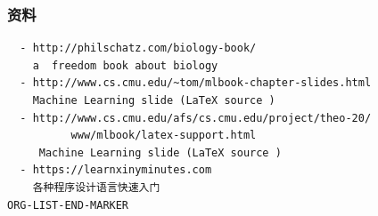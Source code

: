 \documentclass{beamer}
\begin{document}
\begin{frame}[fragile]
\frametitle{资料}
\label{sec-6-3}


\begin{verbatim}
  - http://philschatz.com/biology-book/  
    a  freedom book about biology
  - http://www.cs.cmu.edu/~tom/mlbook-chapter-slides.html   
    Machine Learning slide (LaTeX source )
  - http://www.cs.cmu.edu/afs/cs.cmu.edu/project/theo-20/
          www/mlbook/latex-support.html 
     Machine Learning slide (LaTeX source )
  - https://learnxinyminutes.com 
    各种程序设计语言快速入门
ORG-LIST-END-MARKER
\end{verbatim}
\end{frame}
\end{document}
